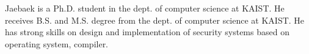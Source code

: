 

\begin{cvparagraph}

    Jaebaek is a Ph.D. student in the dept. of computer science at KAIST.
    He receives B.S. and M.S. degree from the dept. of computer science
    at KAIST. He has strong skills on design and implementation of security
    systems based on operating system, compiler.
\end{cvparagraph}

